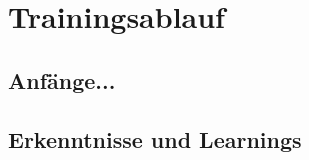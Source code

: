 \newpage
\section{Trainingsablauf}
\subsection{Anfänge...}
\subsection{Erkenntnisse und Learnings}


